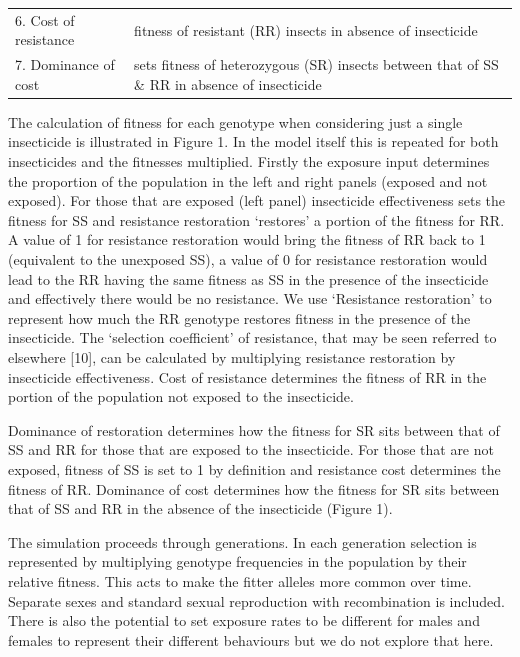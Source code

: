 \documentclass[11pt,]{article}
\begin{document}
\begin{longtable}[]{@{}ll@{}}
\begin{minipage}[t]{0.28\columnwidth}
6. Cost of resistance\strut
\end{minipage} & \begin{minipage}[t]{0.66\columnwidth}\raggedright\strut
fitness of resistant (RR) insects in absence of insecticide\strut
\end{minipage}\tabularnewline
\begin{minipage}[t]{0.28\columnwidth}\raggedright\strut
7. Dominance of cost\strut
\end{minipage} & \begin{minipage}[t]{0.66\columnwidth}\raggedright\strut
sets fitness of heterozygous (SR) insects between that of SS \& RR in
absence of insecticide\strut
\end{minipage}\tabularnewline
\bottomrule
\end{longtable}

The calculation of fitness for each genotype when considering just a
single insecticide is illustrated in Figure 1. In the model itself this
is repeated for both insecticides and the fitnesses multiplied. Firstly
the exposure input determines the proportion of the population in the
left and right panels (exposed and not exposed). For those that are
exposed (left panel) insecticide effectiveness sets the fitness for SS
and resistance restoration `restores' a portion of the fitness for RR. A
value of 1 for resistance restoration would bring the fitness of RR back
to 1 (equivalent to the unexposed SS), a value of 0 for resistance
restoration would lead to the RR having the same fitness as SS in the
presence of the insecticide and effectively there would be no
resistance. We use `Resistance restoration' to represent how much the RR
genotype restores fitness in the presence of the insecticide. The
`selection coefficient' of resistance, that may be seen referred to
elsewhere {[}10{]}, can be calculated by multiplying resistance
restoration by insecticide effectiveness. Cost of resistance determines
the fitness of RR in the portion of the population not exposed to the
insecticide.

Dominance of restoration determines how the fitness for SR sits between
that of SS and RR for those that are exposed to the insecticide. For
those that are not exposed, fitness of SS is set to 1 by definition and
resistance cost determines the fitness of RR. Dominance of cost
determines how the fitness for SR sits between that of SS and RR in the
absence of the insecticide (Figure 1).

The simulation proceeds through generations. In each generation
selection is represented by multiplying genotype frequencies in the
population by their relative fitness. This acts to make the fitter
alleles more common over time. Separate sexes and standard sexual
reproduction with recombination is included. There is also the potential
to set exposure rates to be different for males and females to represent
their different behaviours but we do not explore that here.
\end{document}
